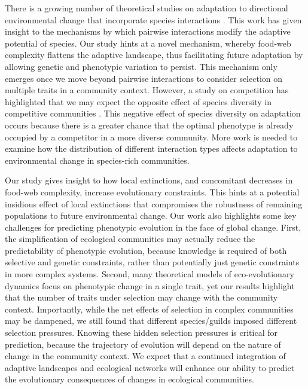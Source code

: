 \documentclass[11pt,]{article}
\begin{document}
There is a growing number of theoretical studies on adaptation to
directional environmental change that incorporate species interactions
\citep[e.g.][]{deMazancourt2008, Johansson2008, Norberg2012, Osmond2017PredatorsHelpPrey}.
This work has given insight to the mechanisms by which pairwise
interactions modify the adaptive potential of species. Our study hints
at a novel mechanism, whereby food-web complexity flattens the adaptive
landscape, thus facilitating future adaptation by allowing genetic and
phenotypic variation to persist. This mechanism only emerges once we
move beyond pairwise interactions to consider selection on multiple
traits in a community context. However, a study on competition has
highlighted that we may expect the opposite effect of species diversity
in competitive communities \citep{deMazancourt2008}. This negative
effect of species diversity on adaptation occurs because there is a
greater chance that the optimal phenotype is already occupied by a
competitor in a more diverse community. More work is needed to examine
how the distribution of different interaction types affects adaptation
to environmental change in species-rich communities.

Our study gives insight to how local extinctions, and concomitant
decreases in food-web complexity, increase evolutionary constraints.
This hints at a potential insidious effect of local extinctions that
compromises the robustness of remaining populations to future
environmental change. Our work also highlights some key challenges for
predicting phenotypic evolution in the face of global change. First, the
simplification of ecological communities may actually reduce the
predictability of phenotypic evolution, because knowledge is required of
both selective and genetic constraints, rather than potentially just
genetic constraints in more complex systems. Second, many theoretical
models of eco-evolutionary dynamics focus on phenotypic change in a
single trait, yet our results highlight that the number of traits under
selection may change with the community context. Importantly, while the
net effects of selection in complex communities may be dampened, we
still found that different species/guilds imposed different selection
pressures. Knowing these hidden selection pressures is critical for
prediction, because the trajectory of evolution will depend on the
nature of change in the community context. We expect that a continued
integration of adaptive landscapes and ecological networks will enhance
our ability to predict the evolutionary consequences of changes in
ecological communities.


\end{document}
